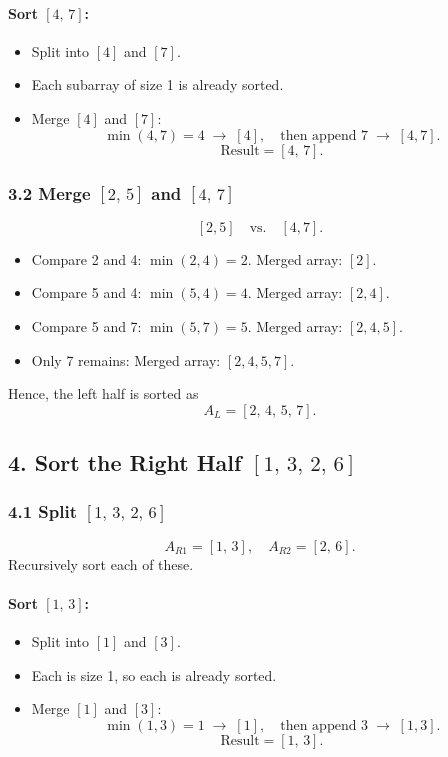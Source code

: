 \documentclass{article}
\theoremstyle{remark}
\begin{document}
\paragraph{Sort \([4,\,7]\):}
\begin{itemize}
    \item Split into \([4]\) and \([7]\).
    \item Each subarray of size 1 is already sorted.
    \item Merge \([4]\) and \([7]\):
    \[
        \min(4,7) = 4 \;\rightarrow\; [4],
        \quad \text{then append } 7 \;\rightarrow\; [4,7].
    \]
    \[
        \text{Result} = [4,\,7].
    \]
\end{itemize}

\subsubsection*{3.2 Merge \([2,\,5]\) and \([4,\,7]\)}
\[
[2,5] \quad \text{vs.} \quad [4,7].
\]
\begin{itemize}
    \item Compare 2 and 4: \(\min(2,4) = 2\). Merged array: \([2]\).
    \item Compare 5 and 4: \(\min(5,4) = 4\). Merged array: \([2,4]\).
    \item Compare 5 and 7: \(\min(5,7) = 5\). Merged array: \([2,4,5]\).
    \item Only 7 remains: Merged array: \([2,4,5,7]\).
\end{itemize}
Hence, the left half is sorted as
\[
A_L = [2,\,4,\,5,\,7].
\]

\subsection*{4. Sort the Right Half \([1,\,3,\,2,\,6]\)}

\subsubsection*{4.1 Split \([1,\,3,\,2,\,6]\)}
\[
A_{R1} = [1,\,3], \quad
A_{R2} = [2,\,6].
\]
Recursively sort each of these.

\paragraph{Sort \([1,\,3]\):}
\begin{itemize}
    \item Split into \([1]\) and \([3]\).
    \item Each is size 1, so each is already sorted.
    \item Merge \([1]\) and \([3]\):
    \[
        \min(1,3) = 1 \;\rightarrow\; [1],
        \quad \text{then append } 3 \;\rightarrow\; [1,3].
    \]
    \[
        \text{Result} = [1,\,3].
    \]
\end{itemize}
\end{document}
